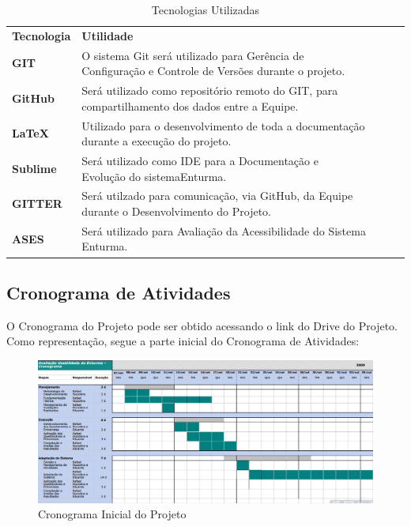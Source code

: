 	\begin{table}[H]
		\centering
		
		\label{tecnologias}
		\begin{tabular}{|l|l|lll}
			\cline{1-2}
			{\bf Tecnologia} & {\bf Utilidade}                                                                                          & {\bf } &  &  \\ \cline{1-2}
			{\bf GIT}        & O sistema Git será utilizado para Gerência de Configuração e Controle de Versões durante o projeto.      &        &  &  \\ \cline{1-2}
			{\bf GitHub}     & Será utilizado como repositório remoto do GIT, para compartilhamento dos dados entre a Equipe.           &        &  &  \\ \cline{1-2}
			{\bf LaTeX}      & Utilizado para o desenvolvimento de toda a documentação durante a execução do projeto. &        &  &  \\ \cline{1-2}
			{\bf Sublime}    & Será utilizado como IDE para a Documentação e Evolução do sistemaEnturma.   &        &  &  \\ \cline{1-2}
			{\bf GITTER}     & Será utilzado para comunicação, via GitHub, da Equipe durante o Desenvolvimento do Projeto.                 &        &  &  \\ \cline{1-2}
			{\bf ASES}       & Será utilizado para Avaliação da Acessibilidade do Sistema Enturma. &        &  &  \\ \cline{1-2}
		\end{tabular}
		\caption{Tecnologias Utilizadas}
	\end{table}

\subsection{Cronograma de Atividades}

	O Cronograma do Projeto pode ser obtido acessando o link do Drive do Projeto. Como representação, segue a parte inicial do Cronograma de Atividades:

	\begin{figure}[H]
		\centering
		\includegraphics[width=1\textwidth]{imagens/cronograma}
		\caption{Cronograma Inicial do Projeto}
		\label{img:cronograma}
	\end{figure}

